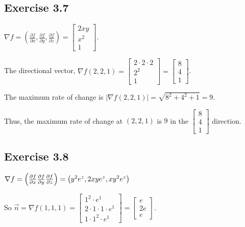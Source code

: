 \documentclass[11pt,fleqn]{book} %
\begin{document}
\subsection*{Exercise 3.7}

$\nabla f = \left( \frac{\partial f}{\partial x}, \frac{\partial f}{\partial y}, \frac{\partial f}{\partial z} \right) = \begin{bmatrix} 2xy \\ x^2 \\ 1 \end{bmatrix}$. 

The directional vector, $\nabla f(2, 2, 1) = \begin{bmatrix} 2 \cdot 2 \cdot 2 \\ 2^2 \\ 1 \end{bmatrix} = \begin{bmatrix} 8 \\ 4 \\ 1 \end{bmatrix}$. 

The maximum rate of change is $| \nabla f(2, 2, 1) | = \sqrt{8^2 + 4^2 + 1} = 9$. 

Thus, the maximum rate of change at $(2, 2, 1)$ is $9$ in the $\begin{bmatrix} 8 \\ 4 \\ 1 \end{bmatrix}$ direction. 

\subsection*{Exercise 3.8}

$\nabla f  = \left( \frac{\partial f}{\partial x} \\ \frac{\partial f}{\partial y} \\ \frac{\partial f}{\partial z} \right) = \left( y^2e^z, 2xye^z, xy^2e^z \right)$

So $\vec{n} = \nabla f(1,1,1) = \begin{bmatrix} 1^2 \cdot e^1 \\ 2 \cdot 1 \cdot 1 \cdot e^1 \\ 1 \cdot 1^2 \cdot e^1 \end{bmatrix} = \begin{bmatrix} e \\ 2e \\ e \end{bmatrix}$.
\end{document}
